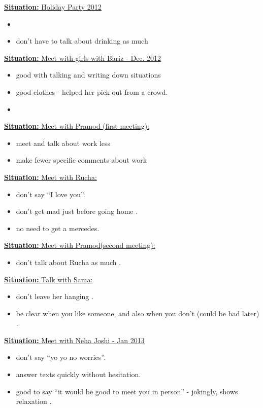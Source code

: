 \documentclass[11pt]{article}
\newcommand{\newSituation}[1]{\underline{\textbf{Situation:} #1} }
\begin{document}
\newSituation{Holiday Party 2012}
\begin{itemize}
\item 
\item don't have to talk about drinking as much 
\end{itemize}

\newSituation{Meet with girls with Bariz - Dec. 2012} 
\begin{itemize} 
\item good with talking and writing down situations 
\item good clothes - helped her pick out from a crowd. 
\item 
\end{itemize} 

\newSituation{Meet with Pramod (first meeting):} 
\begin{itemize}
\item meet and talk about work less 
\item make fewer specific comments about work 
\end{itemize}

\newSituation{Meet with Rucha:} 
\begin{itemize} 
\item don't say ``I love you''. 
\item don't get mad just before going home . 
\item no need to get a mercedes. 
\end{itemize}

\newSituation{Meet with Pramod(second meeting):} 
\begin{itemize} 
\item don't talk about Rucha as much . 
\end{itemize} 

\newSituation{Talk with Sama:} 
\begin{itemize} 
\item don’t leave her hanging . 
\item be clear when you like someone, and also when you don’t (could be bad later)  . 
\end{itemize} 

\newSituation{Meet with Neha Joshi - Jan 2013} 
\begin{itemize} 
\item don’t say “yo yo no worries”. 
\item answer texts quickly without hesitation. 
\item good to say ``it would be good to meet you in person'' - jokingly, shows relaxation . 
\end{itemize} 
\end{document}
